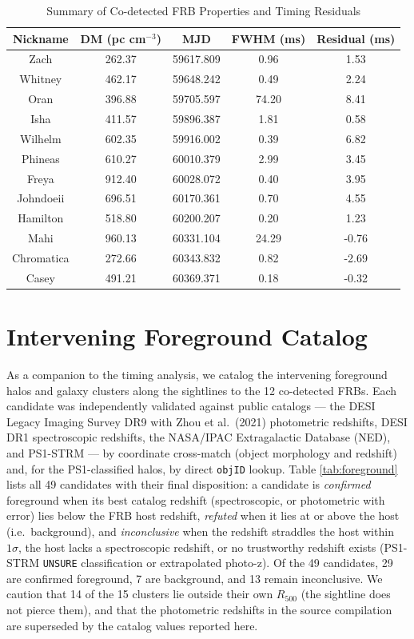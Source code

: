 \documentclass[twocolumn]{aastex631}
\begin{document}
\begin{table}[h!]
    \centering
    \caption{Summary of Co-detected FRB Properties and Timing Residuals}
    \begin{tabular}{ccccc}
    \hline \hline
    Nickname & DM (pc cm$^{-3}$) & MJD & FWHM (ms) & Residual (ms) \\ \hline
    Zach         & 262.37 & 59617.809 & 0.96 & 1.53 \\
    Whitney      & 462.17 & 59648.242 & 0.49 & 2.24 \\
    Oran         & 396.88 & 59705.597 & 74.20 & 8.41 \\
    Isha         & 411.57 & 59896.387 & 1.81 & 0.58 \\
    Wilhelm      & 602.35 & 59916.002 & 0.39 & 6.82 \\
    Phineas      & 610.27 & 60010.379 & 2.99 & 3.45 \\
    Freya        & 912.40 & 60028.072 & 0.40 & 3.95 \\
    Johndoeii    & 696.51 & 60170.361 & 0.70 & 4.55 \\
    Hamilton     & 518.80 & 60200.207 & 0.20 & 1.23 \\
    Mahi         & 960.13 & 60331.104 & 24.29 & -0.76 \\
    Chromatica   & 272.66 & 60343.832 & 0.82 & -2.69 \\
    Casey        & 491.21 & 60369.371 & 0.18 & -0.32 \\ \hline
    \end{tabular}
    \label{tab:results}
\end{table}

\section{Intervening Foreground Catalog} \label{sec:foreground}

As a companion to the timing analysis, we catalog the intervening foreground halos and galaxy clusters along the sightlines to the 12 co-detected FRBs. Each candidate was independently validated against public catalogs --- the DESI Legacy Imaging Survey DR9 with Zhou et al.\ (2021) photometric redshifts, DESI DR1 spectroscopic redshifts, the NASA/IPAC Extragalactic Database (NED), and PS1-STRM \citep{Beck2021} --- by coordinate cross-match (object morphology and redshift) and, for the PS1-classified halos, by direct \texttt{objID} lookup. Table \ref{tab:foreground} lists all 49 candidates with their final disposition: a candidate is \emph{confirmed} foreground when its best catalog redshift (spectroscopic, or photometric with error) lies below the FRB host redshift, \emph{refuted} when it lies at or above the host (i.e.\ background), and \emph{inconclusive} when the redshift straddles the host within $1\sigma$, the host lacks a spectroscopic redshift, or no trustworthy redshift exists (PS1-STRM \texttt{UNSURE} classification or extrapolated photo-z). Of the 49 candidates, 29 are confirmed foreground, 7 are background, and 13 remain inconclusive. We caution that 14 of the 15 clusters lie outside their own $R_{500}$ (the sightline does not pierce them), and that the photometric redshifts in the source compilation are superseded by the catalog values reported here.


\end{document}
